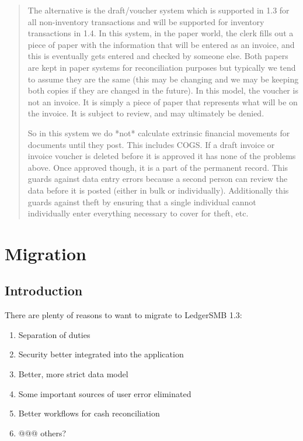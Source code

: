 \begin{quote}
The alternative is the draft/voucher system which is supported in 1.3 for all non-inventory transactions and will be supported for inventory transactions in 1.4.  In this system, in the paper world, the clerk fills out a piece of paper with the information that will be entered as an invoice, and this is eventually gets entered and checked by someone else.  Both papers are kept in paper systems for reconciliation purposes but typically we tend to assume they are the same (this may be changing and we may be keeping both copies if they are changed in the future).  In this model, the voucher is not an invoice.  It is simply a piece of paper that represents what will be on the invoice.  It is subject to review, and may ultimately be denied.

So in this system we do *not* calculate extrinsic financial movements for documents until they post.  This includes COGS.  If a draft invoice or invoice voucher is deleted before it is approved it has none of the problems above.  Once approved though, it is a part of the permanent record.  This guards against data entry errors because a second person can review the data  before it is posted (either in bulk or individually).   Additionally this guards against theft by ensuring that a single individual cannot individually enter everything necessary to cover for theft, etc.
\end{quote}

\chapter{Migration}

\section{Introduction}

There are plenty of reasons to want to migrate to LedgerSMB 1.3:

\begin{enumerate}
\item Separation of duties
\item Security better integrated into the application
\item Better, more strict data model
\label{item:StricterDataModel}
\item Some important sources of user error eliminated
\item Better workflows for cash reconciliation
\item @@@ others?
\end{enumerate}

